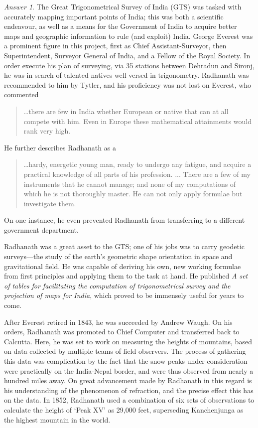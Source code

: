 \documentclass[11pt]{article}
\theoremstyle{remark}
\newtheorem*{answer}{Answer}
\begin{document}
\begin{answer}
        The Great Trigonometrical Survey of India (GTS) was tasked with accurately
        mapping important points of India; this was both a scientific endeavour, as
        well as a means for the Government of India to acquire better maps and
        geographic information to rule (and exploit) India. George Everest was a
        prominent figure in this project, first as Chief Assistant-Surveyor, then
        Superintendent, Surveyor General of India, and a Fellow of the Royal Society.
        In order execute his plan of surveying, via 35 stations between Dehradun and
        Sironj, he was in search of talented natives well versed in trigonometry.
        Radhanath was recommended to him by Tytler, and his proficiency was not lost
        on Everest, who commented
        \begin{quote}
            \dots there are few in India whether European or native that can at all
            compete with him. Even in Europe these mathematical attainments would
            rank very high.
        \end{quote}
        He further describes Radhanath as a
        \begin{quote}
            \dots hardy, energetic young man, ready to undergo any fatigue, and
            acquire a practical knowledge of all parts of his profession. ... There
            are a few of my instruments that he cannot manage; and none of my
            computations of which he is not thoroughly master. He can not only apply
            formulae but investigate them.
        \end{quote}
        On one instance, he even prevented Radhanath from transferring to a different
        government department.

        Radhanath was a great asset to the GTS; one of his jobs was to carry geodetic
        surveys—the study of the earth’s geometric shape orientation in space and
        gravitational field. He was capable of deriving his own, new working formulae
        from first principles and applying them to the task at hand.  He published
        \emph{A set of tables for facilitating the computation of trigonometrical
        survey and the projection of maps for India}, which proved to be immensely
        useful for years to come.

        After Everest retired in 1843, he was succeeded by Andrew Waugh. On his
        orders, Radhanath was promoted to Chief Computer and transferred back to
        Calcutta. Here, he was set to work on measuring the heights of mountains,
        based on data collected by multiple teams of field observers. The process of
        gathering this data was complication by the fact that the snow peaks under
        consideration were practically on the India-Nepal border, and were thus
        observed from nearly a hundred miles away. On great advancement made by
        Radhanath in this regard is his understanding of the phenomenon of
        refraction, and the precise effect this has on the data. In 1852, Radhanath
        used a combination of six sets of observations to calculate the height of
        `Peak XV' as 29,000 feet, superseding Kanchenjunga as the highest mountain in
        the world.


\end{answer}
\end{document}

